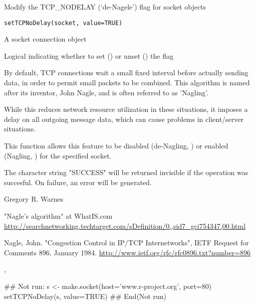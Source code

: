\begin{Description}\relax
Modify the TCP\_NODELAY (`de-Nagele') flag for socket objects
\end{Description}
\begin{Usage}
\begin{verbatim}
setTCPNoDelay(socket, value=TRUE)
\end{verbatim}
\end{Usage}
\begin{Arguments}
\begin{ldescription}
\item[\code{socket}] A socket connection object
\item[\code{value}] Logical indicating whether to set () or unset
() the flag
\end{ldescription}
\end{Arguments}
\begin{Details}\relax
By default, TCP connections wait a small fixed interval before
actually sending data, in order to permit small packets to be
combined.  This algorithm is named after its inventor, John Nagle, and
is often referred to as 'Nagling'.

While this reduces network resource utilization in these
situations, it imposes a delay on all outgoing message data, which can
cause problems in client/server situations.

This function allows this feature to be disabled (de-Nagling,
) or enabled (Nagling, ) for the
specified socket.
\end{Details}
\begin{Value}
The character string "SUCCESS" will be returned invisible if the
operation was succesful.  On failure, an error will be generated.
\end{Value}
\begin{Author}\relax
Gregory R. Warnes 
\end{Author}
\begin{References}\relax
"Nagle's algorithm" at WhatIS.com \url{
http://searchnetworking.techtarget.com/sDefinition/0,,sid7_gci754347,00.html}

Nagle, John. "Congestion Control in IP/TCP Internetworks", IETF
Request for Comments 896, January 1984.
\url{http://www.ietf.org/rfc/rfc0896.txt?number=896}
\end{References}
\begin{SeeAlso}\relax
{},
\end{SeeAlso}
\begin{Examples}
\begin{ExampleCode}
## Not run: 
   s <- make.socket(host='www.r-project.org', port=80)
   setTCPNoDelay(s, value=TRUE)
## End(Not run)

\end{ExampleCode}
\end{Examples}

